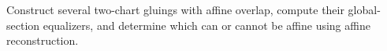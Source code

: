 \begin{problem}\label{chal:vi20-04}
Construct several two-chart gluings with affine overlap, compute their global-section equalizers, and determine which can or cannot be affine using affine reconstruction.
\end{problem}
